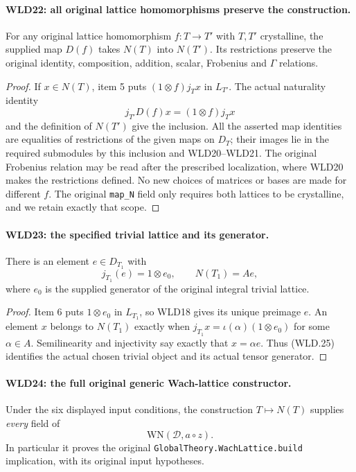 \paragraph{WLD22: all original lattice homomorphisms preserve the construction.}
\label{claim:WLD22}
For any original lattice homomorphism $f:T\to T'$ with $T,T'$
crystalline, the supplied map $D(f)$ takes $N(T)$ into $N(T')$.
Its restrictions preserve the original identity, composition,
addition, scalar, Frobenius and $\Gamma$ relations.

\begin{proof}
If $x\in N(T)$, item 5 puts
$(1\otimes f)j_Tx$ in $L_{T'}$. The actual naturality identity
\[
                       j_{T'}D(f)x=(1\otimes f)j_Tx
\]
and the definition of $N(T')$ give the inclusion.
All the asserted map identities are equalities of restrictions
of the given maps on $D_T$; their images lie in the required
submodules by this inclusion and WLD20--WLD21. The original
Frobenius relation may be read after the prescribed localization,
where WLD20 makes the restrictions defined.
No new choices of matrices or bases are made for different $f$.
The original \texttt{map\_\allowbreak N} field only requires both lattices
to be crystalline, and we retain exactly that scope.
\end{proof}

\paragraph{WLD23: the specified trivial lattice and its generator.}
\label{claim:WLD23}
There is an element $e\in D_{T_1}$ with
\[
        j_{T_1}(e)=1\otimes e_0,\qquad N(T_1)=Ae,           \tag{WLD.25}
\]
where $e_0$ is the supplied generator of the original integral
trivial lattice.

\begin{proof}
Item 6 puts $1\otimes e_0$ in $L_{T_1}$, so WLD18 gives its
unique preimage $e$. An element $x$ belongs to $N(T_1)$ exactly
when $j_{T_1}x=\iota(\alpha)(1\otimes e_0)$ for some
$\alpha\in A$. Semilinearity and injectivity say exactly that
$x=\alpha e$. Thus (WLD.25) identifies the actual chosen
trivial object and its actual tensor generator.
\end{proof}

\paragraph{WLD24: the full original generic Wach-lattice constructor.}
\label{claim:WLD24}
Under the six displayed input conditions, the construction
$T\mapsto N(T)$ supplies \emph{every} field of
\[
                       \mathrm{WN}(\mathcal D,a\circ z).
\]
In particular it proves the original
\texttt{Global\allowbreak Theory.\allowbreak Wach\allowbreak Lattice.\allowbreak build} implication, with its
original input hypotheses.

